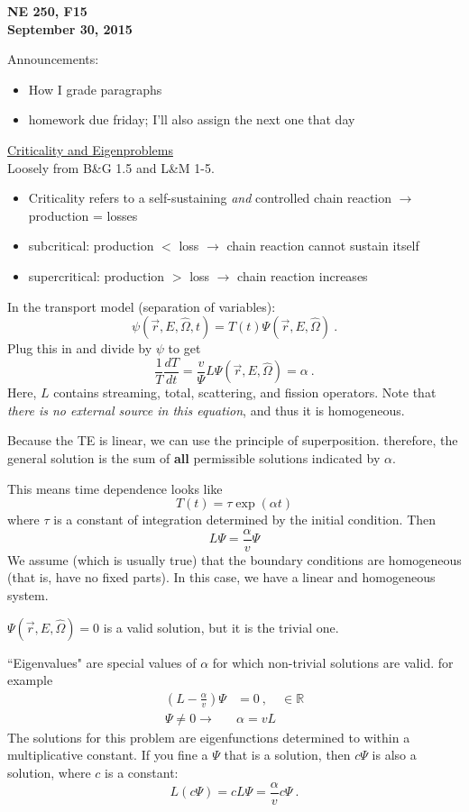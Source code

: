 \documentclass[12pt]{article}
\newcommand{\rvec}{\ensuremath{\vec{r}}}
\newcommand{\vOmega}{\ensuremath{\hat{\Omega}}}
\begin{document}
\begin{center}
{\bf NE 250, F15\\
September 30, 2015 
}
\end{center}

Announcements:
\begin{itemize}
\item How I grade paragraphs
\item homework due friday; I'll also assign the next one that day
\end{itemize}


\underline{Criticality and Eigenproblems}\\
Loosely from B\&G 1.5 and L\&M 1-5.
\begin{itemize}
\item Criticality refers to a self-sustaining \textit{and} controlled chain reaction $\rightarrow$ production = losses
\item subcritical: production $<$ loss $\rightarrow$ chain reaction cannot sustain itself
\item supercritical: production $>$ loss $\rightarrow$ chain reaction increases 
\end{itemize}
%
In the transport model (separation of variables):
\[\psi(\rvec, E, \vOmega, t) = T(t) \Psi(\rvec, E, \vOmega) \:.\]
Plug this in and divide by $\psi$ to get
\[\frac{1}{T}\frac{dT}{dt} = \frac{v}{\Psi} L \Psi(\rvec, E, \vOmega) = \alpha \:.\]
%
Here, $L$ contains streaming, total, scattering, and fission operators. Note that \textit{there is no external source in this equation}, and thus it is homogeneous.

Because the TE is linear, we can use the principle of superposition. 
therefore, the general solution is the sum of \textbf{all} permissible solutions indicated by $\alpha$.

This means time dependence looks like
\[ T(t) = \tau \exp(\alpha t)\]
where $\tau$ is a constant of integration determined by the initial condition.
Then
\[L\Psi = \frac{\alpha}{v}\Psi\]
%
We assume (which is usually true) that the boundary conditions are homogeneous (that is, have no fixed parts).
In this case, we have a linear and homogeneous system.

$\Psi(\rvec, E, \vOmega) = 0$ is a valid solution, but it is the trivial one.

``Eigenvalues" are special values of $\alpha$ for which non-trivial solutions are valid.
for example
\begin{align*}
(L - \frac{\alpha}{v})\Psi &= 0 \:, \quad \in \mathbb{R} \\
\Psi \neq 0 \rightarrow \: &\alpha = v L
\end{align*}
%
The solutions for this problem are eigenfunctions determined to within a multiplicative constant.
If you fine a $\Psi$ that is a solution, then $c \Psi$ is also a solution, where $c$ is a constant:
\[L(c \Psi) = cL \Psi = \frac{\alpha}{v}c \Psi \:.\]
\end{document}
